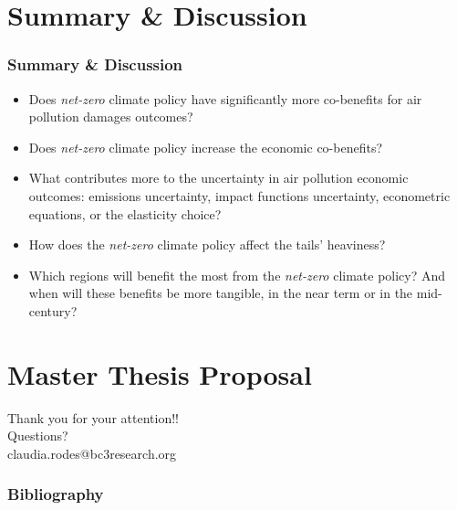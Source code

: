 \documentclass{beamer}
\begin{document}
\section{Summary \& Discussion} 
\begin{frame}
  \frametitle{Summary \& Discussion}
  \begin{itemize}
      \setlength\itemsep{1em}
      \pause \item Does \emph{net-zero} climate policy have significantly more co-benefits for air pollution damages outcomes?
      \pause \item Does \emph{net-zero} climate policy increase the economic co-benefits?
      \pause \item What contributes more to the uncertainty in air pollution economic outcomes: emissions uncertainty, impact functions uncertainty, econometric equations, or the elasticity choice?
      \pause \item How does the \emph{net-zero} climate policy affect the tails' heaviness?
      \pause \item Which regions will benefit the most from the \emph{net-zero} climate policy? And when will these benefits be more tangible, in the near term or in the mid-century?
  \end{itemize}
\end{frame}
  

\section{Master Thesis Proposal} 



\begin{frame}
\centering
    Thank you for your attention!!\\
    \vspace{1cm}
    Questions?\\
    \vspace{3cm}
    \small\textcolor{mygreen}{claudia.rodes@bc3research.org}
\end{frame}


\addtocounter{framenumber}{-1}
\begin{frame}[allowframebreaks]
\frametitle{Bibliography}


\end{frame}




\end{document}

